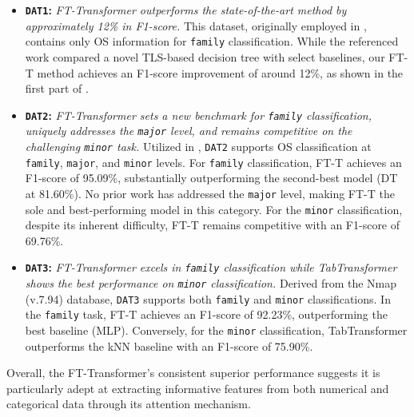 \begin{itemize}
    \item \textbf{\texttt{DAT1}:} \emph{FT-Transformer outperforms the state-of-the-art method by approximately 12\% in F1-score.} This dataset, originally employed in \cite{lastovicka_usingTLS_2020}, contains only OS information for \texttt{family} classification. While the referenced work compared a novel TLS-based decision tree with select baselines, our FT-T method achieves an F1-score improvement of around 12\%, as shown in the first part of .
    
    \item \textbf{\texttt{DAT2}:} \emph{FT-Transformer sets a new benchmark for \texttt{family} classification, uniquely addresses the \texttt{major} level, and remains competitive on the challenging \texttt{minor} task.} Utilized in \cite{lastovicka_passive_2023}, \texttt{DAT2} supports OS classification at \texttt{family}, \texttt{major}, and \texttt{minor} levels. For \texttt{family} classification, FT-T achieves an F1-score of 95.09\%, substantially outperforming the second-best model (DT at 81.60\%). No prior work has addressed the \texttt{major} level, making FT-T the sole and best-performing model in this category. For the \texttt{minor} classification, despite its inherent difficulty, FT-T remains competitive with an F1-score of 69.76\%.
    
    \item \textbf{\texttt{DAT3}:} \emph{FT-Transformer excels in \texttt{family} classification while TabTransformer shows the best performance on \texttt{minor} classification.} Derived from the Nmap (v.7.94) database, \texttt{DAT3} supports both \texttt{family} and \texttt{minor} classifications. In the \texttt{family} task, FT-T achieves an F1-score of 92.23\%, outperforming the best baseline (MLP). Conversely, for the \texttt{minor} classification, TabTransformer outperforms the kNN baseline with an F1-score of 75.90\%.
\end{itemize}

Overall, the FT-Transformer's consistent superior performance suggests it is particularly adept at extracting informative features from both numerical and categorical data through its attention mechanism.

\vfill

